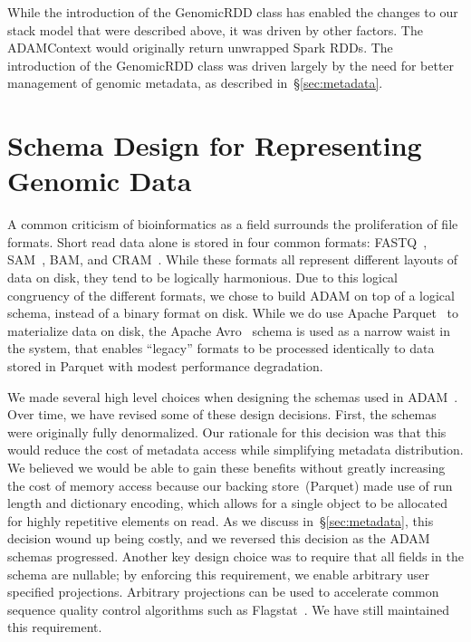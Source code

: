 \documentclass[phd]{ucbthesis}
\begin{document}
While the introduction of the {GenomicRDD} class has enabled the changes
to our stack model that were described above, it was driven by other factors.
The {ADAMContext} would originally return unwrapped {Spark} RDDs.
The introduction of the {GenomicRDD} class was driven largely by the need
for better management of genomic metadata, as described in~\S\ref{sec:metadata}.

\section{Schema Design for Representing Genomic Data}
\label{sec:schema-design}

A common criticism of bioinformatics as a field surrounds the proliferation of file formats. Short read data alone is
stored in four common formats: {FASTQ}~\cite{cock10}, {SAM}~\cite{li09}, {BAM}, and
{CRAM}~\cite{fritz11}. While these formats all represent different layouts of data on disk, they tend to be
logically harmonious. Due to this logical congruency of the different formats, we chose to build {ADAM}
on top of a logical schema, instead of a binary format on disk. While we do use Apache {Parquet}~\cite{parquet} to
materialize data on disk, the Apache {Avro}~\cite{avro} schema is used as a narrow waist in the system,
that enables ``legacy'' formats to be processed identically to data stored in {Parquet} with modest performance
degradation.

We made several high level choices when designing the schemas used in
{ADAM}~\cite{massie13}. Over time, we have revised some of
these design decisions. First, the schemas were originally fully denormalized.
Our rationale for this decision was that this would reduce the cost of metadata
access while simplifying metadata distribution. We believed we would be able to
gain these benefits without greatly increasing the cost of memory access because
our backing store~({Parquet}) made use of run length and dictionary
encoding, which allows for a single object to be allocated for highly repetitive
elements on read. As we discuss in~\S\ref{sec:metadata}, this decision wound up
being costly, and we reversed this decision as the {ADAM} schemas
progressed. Another key design choice was to require that all fields in the
schema are nullable; by enforcing this requirement, we enable arbitrary user
specified projections. Arbitrary projections can be used to accelerate
common sequence quality control algorithms such as Flagstat~\cite{massie13,
  nothaft15}. We have still maintained this requirement.
\end{document}
